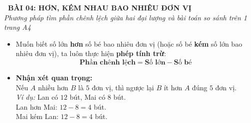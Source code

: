 \documentclass[11pt,a4paper]{article}
\begin{document}
\begin{tcolorbox}[
  enhanced,
  colback=violet!8!white,
  colframe=violet!70!black,
  arc=3mm, boxrule=1.2pt,
  left=3mm, right=3mm, top=2mm, bottom=2mm,
  halign=center
]
  {\LARGE\bfseries\color{violet!90!black}\faBookmark\ BÀI 04: HƠN, KÉM NHAU BAO NHIÊU ĐƠN VỊ}\\[1mm]
  {\itshape\footnotesize\color{black!75} Phương pháp tìm phần chênh lệch giữa hai đại lượng và bài toán so sánh trên 1 trang A4}
\end{tcolorbox}

\vspace{-2mm}

\noindent
\begin{minipage}[t]{0.49\textwidth}\vspace{0pt}
\begin{tcolorbox}[
  enhanced,
  colback=violet!4!white,
  colframe=violet!75!black,
  arc=2mm, boxrule=0.8pt,
  left=2mm, right=2mm, top=1.8mm, bottom=1.8mm,
  title={\footnotesize\bfseries\color{white}\faKey\ 1. Quy tắc tìm phần hơn, kém}
]
{\footnotesize
\begin{itemize}\setlength{\itemsep}{1pt}\setlength{\leftskip}{-2.5mm}
  \item Muốn biết số lớn \textbf{hơn} số bé bao nhiêu đơn vị (hoặc số bé \textbf{kém} số lớn bao nhiêu đơn vị), ta luôn thực hiện \textbf{phép tính trừ}:
  $$\mathbf{\text{Phần chênh lệch} = \text{Số lớn} - \text{Số bé}}$$
  \item \textbf{Nhận xét quan trọng:}\\
  Nếu $A$ nhiều hơn $B$ là $5$ đơn vị, thì ngược lại $B$ ít hơn $A$ đúng $5$ đơn vị.\\
  \textit{Ví dụ:} Lan có $12$ bút, Mai có $8$ bút.\\
  Lan hơn Mai: $12 - 8 = 4$ bút.\\
  Mai kém Lan: $12 - 8 = 4$ bút.
\end{itemize}
}
\end{tcolorbox}
\end{minipage}
\hfill
\end{document}
